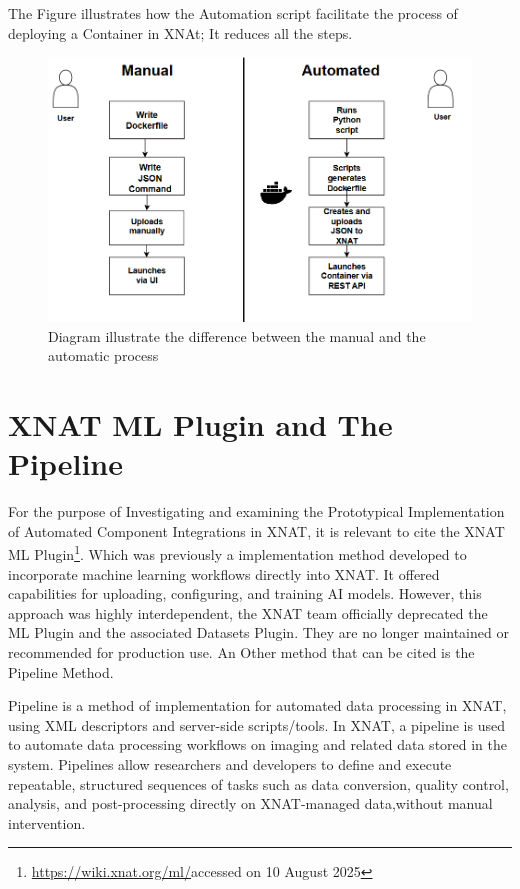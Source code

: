 The Figure illustrates how the Automation script facilitate the process of deploying a Container in XNAt; It reduces all the steps. 


\begin{figure}
    \centering
    \includegraphics[width=0.6\linewidth]{en/content/o.png}
    \caption{Diagram illustrate the difference between the manual and the automatic process }
    \label{fig:enter-label}
\end{figure}

\section{XNAT ML Plugin and The Pipeline}
For the purpose of Investigating and examining the Prototypical Implementation of
Automated Component Integrations in XNAT, it is relevant to cite the XNAT ML Plugin\footnote{ \url{https://wiki.xnat.org/ml/}accessed on 10 August 2025}. Which was previously a implementation method developed to incorporate machine learning workflows directly into XNAT. It offered capabilities for uploading, configuring, and training AI models. However, this approach was highly interdependent, the XNAT team officially deprecated the ML Plugin and the associated Datasets Plugin. They are no longer maintained or recommended for production use. An Other method that can be cited is the Pipeline Method.

Pipeline is a method of implementation for automated data processing in XNAT, using \ac{XML} descriptors and server-side scripts/tools. In XNAT, a pipeline is used to automate data processing workflows on imaging and related data stored in the
system. Pipelines allow researchers and developers to define and execute repeatable, structured sequences of
tasks such as data conversion, quality control, analysis, and post-processing directly on XNAT-managed data,without manual intervention.

